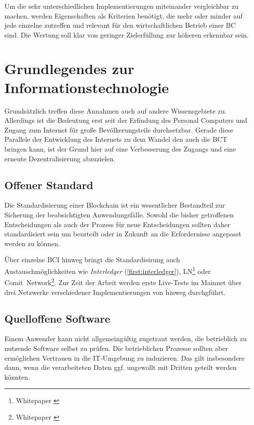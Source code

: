 Um die sehr unterschiedlichen Implementierungen miteinander vergleichbar zu machen, werden Eigenschaften als Kriterien benötigt, die mehr oder minder auf jede einzelne zutreffen und relevant für den wirtschaftlichen Betrieb einer \gls{BC} sind.
Die Wertung soll klar von geringer Zielerfüllung zur höheren erkennbar sein.

\section{Grundlegendes zur Informationstechnologie}\label{krit:it}

Grundsätzlich treffen diese Annahmen auch auf andere Wissensgebiete zu.
Allerdings ist die Bedeutung erst seit der Erfindung des Personal Computers und Zugang zum Internet für große Bevölkerungsteile durchsetzbar.
Gerade diese Parallele der Entwicklung des Internets zu dem Wandel den auch die \gls{BCT} bringen kann, ist der Grund hier auf eine Verbesserung des Zugangs und eine erneute Dezentralisierung abzuzielen.


\subsection{Offener Standard}\label{krit:openstandard}

Die Standardisierung einer Blockchain ist ein wesentlicher Bestandteil zur Sicherung der beabsichtigten Anwendungsfälle.
Sowohl die bisher getroffenen Entscheidungen als auch der Prozess für neue Entscheidungen sollten daher standardisiert sein um beurteilt oder in Zukunft an die Erfordernisse angepasst werden zu können.

Über einzelne \gls{BCI} hinweg bringt die Standardieirung auch Austauschmöglichkeiten wie \emph{Interledger} (\ref{first:interledger}), \gls{LN}\footnote{Whitepaper \autocite{p:lightning}} oder Comit~Network\footnote{Whitepaper \autocite{p:comit}}. Zur Zeit der Arbeit werden erste Live-Tests im Mainnet über drei Netzwerke verschiedener Implementierungen von hinweg durchgführt.
\subsection{Quelloffene Software}\label{krit:opensource}

Einem Anwender kann nicht allgemeingültig zugetraut werden, die betrieblich zu nutzende Software selbst zu prüfen. Die betrieblichen Prozesse sollten aber ermöglichen Vertrauen in die IT-Umgebung zu induzieren. Das gilt insbesondere dann, wenn die verarbeiteten Daten ggf. ungewollt mit Dritten geteilt werden könnten.

